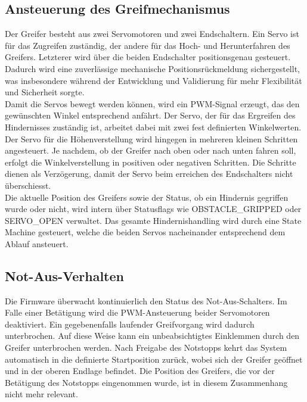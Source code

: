 \documentclass[main.tex]{subfiles} %
\begin{document}
\subsection{Ansteuerung des Greifmechanismus}
Der Greifer besteht aus zwei Servomotoren und zwei Endschaltern. Ein Servo ist für das Zugreifen zuständig,
der andere für das Hoch- und Herunterfahren des Greifers. Letzterer wird über die beiden Endschalter
positionsgenau gesteuert. Dadurch wird eine zuverlässige mechanische Positionsrückmeldung sichergestellt,
was insbesondere während der Entwicklung und Validierung für mehr Flexibilität und Sicherheit sorgte.\\
Damit die Servos bewegt werden können, wird ein PWM-Signal erzeugt, das den
gewünschten Winkel entsprechend anfährt. Der Servo, der für das Ergreifen des Hindernisses zuständig ist,
arbeitet dabei mit zwei fest definierten Winkelwerten. Der Servo für die Höhenverstellung wird hingegen in
mehreren kleinen Schritten angesteuert. Je nachdem, ob der Greifer nach oben oder nach unten fahren soll,
erfolgt die Winkelverstellung in positiven oder negativen Schritten. Die Schritte dienen als Verzögerung,
damit der Servo beim erreichen des Endschalters nicht überschiesst.\\
Die aktuelle Position des Greifers sowie der Status, ob ein Hindernis gegriffen wurde oder nicht, wird intern
über Statusflags wie OBSTACLE\_GRIPPED oder SERVO\_OPEN verwaltet. Das gesamte Hindernishandling wird durch
eine State Machine gesteuert, welche die beiden Servos nacheinander entsprechend dem Ablauf ansteuert.

\subsection{Not-Aus-Verhalten}
Die Firmware überwacht kontinuierlich den Status des Not-Aus-Schalters. Im Falle einer Betätigung
wird die PWM-Ansteuerung beider Servomotoren deaktiviert. Ein gegebenenfalls laufender Greifvorgang wird dadurch unterbrochen.
Auf diese Weise kann ein unbeabsichtigtes Einklemmen durch den Greifer unterbrochen werden. Nach Freigabe des Notstopps kehrt das System automatisch
in die definierte Startposition zurück, wobei sich der Greifer geöffnet und in der oberen Endlage befindet. Die Position des Greifers, die
vor der Betätigung des Notstopps eingenommen wurde, ist in diesem Zusammenhang nicht mehr relevant.
\end{document}

